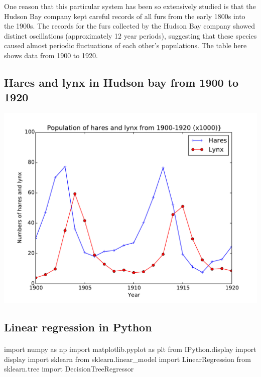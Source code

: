 \documentclass[%
oneside,                 %
final,                   %
10pt]{article}
\begin{document}
One reason that this particular system has been so extensively studied is that the Hudson Bay company kept careful records of all furs from the early 1800s into the 1900s. The records for the furs collected by the Hudson Bay company showed distinct oscillations (approximately 12 year periods), suggesting that these species caused almost periodic fluctuations of each other's populations. The table here shows data from 1900 to 1920.




\subsection{Hares and lynx in Hudson bay from 1900 to 1920}



\vspace{6mm}

\centerline{\includegraphics[width=0.9\linewidth]{figures/Hudson_Bay_data.pdf}}

\vspace{6mm}




\subsection{Linear regression in Python}

\paragraph{}
\bpycod
import numpy as np
import matplotlib.pyplot as plt
from IPython.display import display
import sklearn
from sklearn.linear_model import LinearRegression
from sklearn.tree import DecisionTreeRegressor
\end{document}
